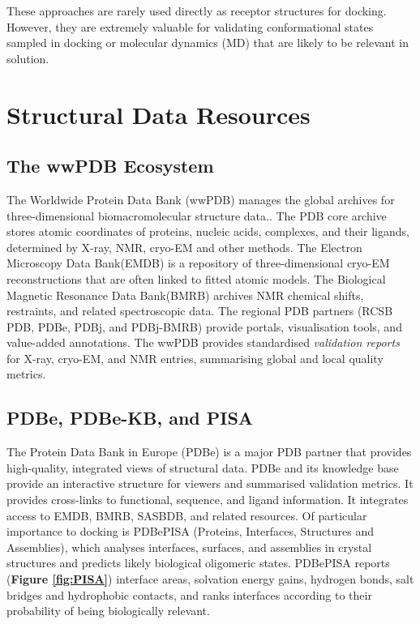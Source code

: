 \documentclass[12pt]{article}
\begin{document}
These approaches are rarely used directly as receptor structures for docking. However, they are extremely valuable for validating conformational states sampled in docking or molecular dynamics (MD) that are likely to be relevant in solution.

\section{Structural Data Resources}

\subsection{The wwPDB Ecosystem}

The Worldwide Protein Data Bank (wwPDB) manages the global archives for three-dimensional biomacromolecular structure data.\cite{CH4_Berman2000_PDB,CH4_wwpdb2019protein,CH4_young2018worldwide}. The PDB core archive\cite{CH4_Berman2000_PDB,CH4_wwpdb2019protein} stores atomic coordinates of proteins, nucleic acids, complexes, and their ligands, determined by X-ray, NMR, cryo-EM and other methods. The Electron Microscopy Data Bank(EMDB)\cite{CH4_wwpdb2024emdb} is a repository of three-dimensional cryo-EM reconstructions that are often linked to fitted atomic models. The Biological Magnetic Resonance Data Bank(BMRB)\cite{CH4_Ulrich2008_BMRB} archives NMR chemical shifts, restraints, and related spectroscopic data.
The regional PDB partners (RCSB PDB, PDBe, PDBj, and PDBj-BMRB)\cite{CH4_wwpdb2019protein,CH4_Velankar2016_PDBe} provide portals, visualisation tools, and value-added annotations. The wwPDB provides standardised \emph{validation reports} for X-ray, cryo-EM, and NMR entries, summarising global and local quality metrics.\cite{CH4_karplus2012linking,CH4_shao2017multivariate,CH4_young2018worldwide}


\subsection{PDBe, PDBe-KB, and PISA}
The Protein Data Bank in Europe (PDBe)\cite{CH4_Velankar2016_PDBe} is a major PDB partner that provides high-quality, integrated views of structural data. PDBe and its knowledge base provide an interactive structure for viewers and summarised validation metrics. It provides cross-links to functional, sequence, and ligand information. It integrates access to EMDB, BMRB, SASBDB, and related resources. Of particular importance to docking is PDBePISA (Proteins, Interfaces, Structures and Assemblies)\cite{CH4_Krissinel2007_PISA}, which analyses interfaces, surfaces, and assemblies in crystal structures and predicts likely biological oligomeric states. PDBePISA reports (\textbf{Figure \ref{fig:PISA}}) interface areas, solvation energy gains, hydrogen bonds, salt bridges and hydrophobic contacts, and ranks interfaces according to their probability of being biologically relevant.
\end{document}

